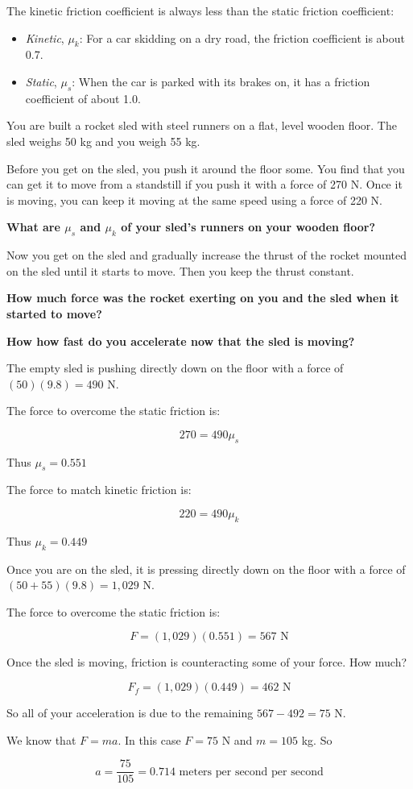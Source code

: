 The kinetic friction coefficient is always less than the static friction coefficient:
\begin{itemize}
\item \textit{Kinetic}, $\mu_k$: For a car skidding on a dry road,  the friction coefficient is about 0.7.  
\item \textit{Static}, $\mu_s$: When the car is parked with its brakes on,  it has a friction coefficient of about 1.0.
\end{itemize}

\begin{Exercise}[title={Rocket Sled},  label=rocketsled1]
  
You are built a rocket sled with steel runners on a flat, level wooden floor.   The sled weighs 50 kg and you weigh 55 kg.

Before you get on the sled,   you push it around the floor some.  You find that you can get it to move from a
standstill if you push it with a force of 270 N.   Once it is moving,  you can keep it moving at the same speed using a force of 220 N.

\textbf{What are $\mu_s$ and $\mu_k$  of your sled's runners on your wooden floor?}

Now you get on the sled and gradually increase the thrust of the rocket mounted on the sled until it starts to move.  Then you keep the thrust constant.

\textbf{How much force was the rocket exerting on you and the sled when it started to move?}

\textbf{How how fast do you accelerate now that the sled is moving?}

\end{Exercise}
\begin{Answer}[ref=rocketsled1]

The empty sled is pushing directly down on the floor with a force of $(50)(9.8) = 490$ N.

The force to overcome the static friction  is:

$$270 = 490 \mu_s$$

Thus $\mu_s = 0.551$

The force to match kinetic friction is:

$$220 = 490 \mu_k$$

Thus $\mu_k = 0.449$

Once you are on the sled,  it is pressing directly down on the floor with a force of $(50  + 55)(9.8) = 1,029$ N.

The force to overcome the static friction is:

$$F = (1,029)(0.551) = 567 \text{ N}$$

Once the sled is moving,  friction is counteracting some of your force.  How much?

$$F_f = (1,029)(0.449) = 462 \text{ N}$$

So all of your acceleration is due to the remaining $567 - 492 = 75$ N.

We know that $F = ma$.  In this case $F = 75$ N and $m = 105$ kg.  So

$$a = \frac{75}{105} = 0.714 \text{ meters per second per second}$$

\end{Answer}


